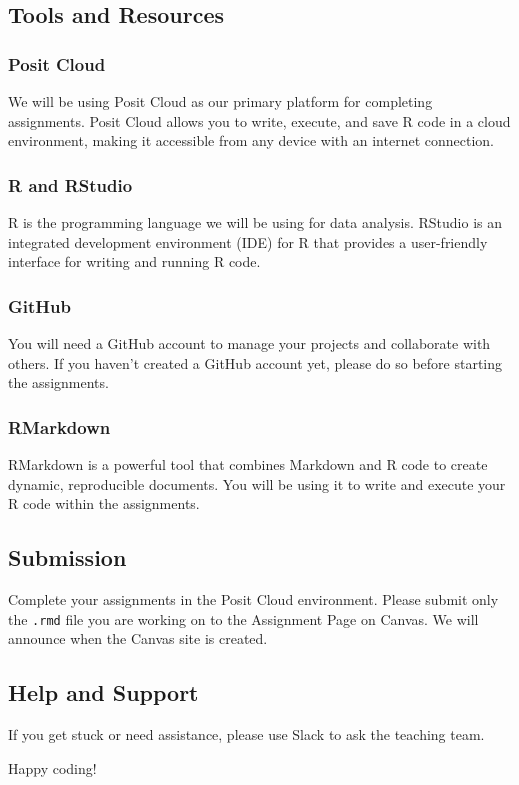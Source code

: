 \documentclass[
]{article}
\begin{document}
\subsection{Tools and Resources}\label{tools-and-resources}

\subsubsection{Posit Cloud}\label{posit-cloud}

We will be using Posit Cloud as our primary platform for completing
assignments. Posit Cloud allows you to write, execute, and save R code
in a cloud environment, making it accessible from any device with an
internet connection.

\subsubsection{R and RStudio}\label{r-and-rstudio}

R is the programming language we will be using for data analysis.
RStudio is an integrated development environment (IDE) for R that
provides a user-friendly interface for writing and running R code.

\subsubsection{GitHub}\label{github}

You will need a GitHub account to manage your projects and collaborate
with others. If you haven't created a GitHub account yet, please do so
before starting the assignments.

\subsubsection{RMarkdown}\label{rmarkdown}

RMarkdown is a powerful tool that combines Markdown and R code to create
dynamic, reproducible documents. You will be using it to write and
execute your R code within the assignments.

\subsection{Submission}\label{submission}

Complete your assignments in the Posit Cloud environment. Please submit
only the \texttt{.rmd} file you are working on to the Assignment Page on
Canvas. We will announce when the Canvas site is created.

\subsection{Help and Support}\label{help-and-support}

If you get stuck or need assistance, please use Slack to ask the
teaching team.

Happy coding!
\end{document}
